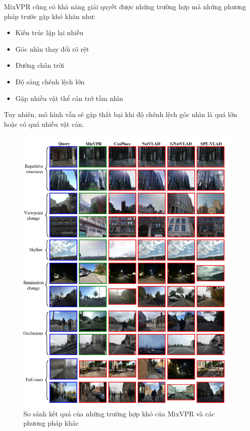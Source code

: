 MixVPR cũng có khả năng giải quyết được những trường hợp mà những phương pháp trước gặp khó khăn như:
\begin{itemize}
    \item Kiến trúc lặp lại nhiều
    \item Góc nhìn thay đổi rõ rệt
    \item Đường chân trời
    \item Độ sáng chênh lệch lớn
    \item Gặp nhiều vật thể cản trở tầm nhìn
\end{itemize}
Tuy nhiên, mô hình vẫn sẽ gặp thất bại khi độ chênh lệch góc nhìn là quá lớn hoặc có quá nhiều vật cản.

\begin{figure}[H]
    \centering
    \includegraphics[scale=0.5]{pics/Proposal/fail.png}
    \caption{So sánh kết quả của những trường hợp khó của MixVPR và các phương pháp khác \cite{alibey2023mixvpr}}
\end{figure}

